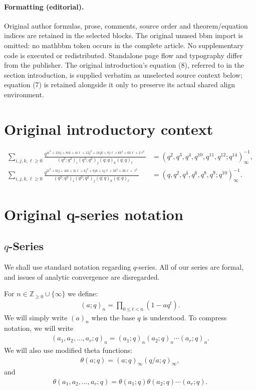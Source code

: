 \documentclass[10pt]{article}
\newcommand{\ZZ}{\mathbb{Z}}
\begin{document}
\paragraph{Formatting (editorial).} Original author formulas, prose, comments, source order and theorem/equation indices are retained in the selected blocks. The original unused bbm import is omitted: no mathbbm token occurs in the complete article. No supplementary code is executed or redistributed. Standalone page flow and typography differ from the publisher. The original introduction's equation (8), referred to in the section introduction, is supplied verbatim as unselected source context below; equation (7) is retained alongside it only to preserve its actual shared align environment.
\clearpage
\section*{Original introductory context}
\setcounter{equation}{6}
\begin{align}
\sum_{i,j,k,\ell \ge 0}
\frac{q^{4i^2 + 12 ij + 8ik + 4i\ell + 12j^2 + 16jk + 8j\ell + 6k^2+6k\ell+2\ell^2}}
{\left(q^2;q^2\right)_i\left(q^2;q^2\right)_j\left(q;q\right)_k\left(q;q\right)_\ell}
&= \left(q^2,q^3,q^4,q^{10},q^{11},q^{12};q^{14}\right)^{-1}_\infty \label{eqn:Nandi_intro}, \\ 
\sum_{i,j,k,\ell \ge 0}
\frac{q^{2i^2 + 6 ij + 4ik + 2i\ell + 6j^2 + 8 jk + 4 j\ell + 3k^2+3k\ell+\ell^2}}
{\left(q^2;q^2\right)_i\left(q^2;q^2\right)_j\left(q;q\right)_k\left(q;q\right)_\ell} 
&=\left(q,q^2,q^4,q^6,q^8,q^9;q^{10}\right)^{-1}_\infty\label{eqn:mod10_intro}.
\end{align}
\section*{Original q-series notation}
\setcounter{section}{2}
\setcounter{subsection}{1}
\setcounter{equation}{10}
\subsection{\texorpdfstring{$q$-Series}{q-Series}}
We shall use standard notation regarding $q$-series. 
All of our series are formal, and issues of analytic convergence are disregarded.

For $n\in\ZZ_{\geq 0}\cup\{\infty\}$ we define:
\begin{align}
(a;q)_n=\prod_{0\leq t<n}(1-aq^{t}).
\end{align}
We will simply write $(a)_n$ when the base $q$ is understood.
To compress notation, we will write
\begin{align}
(a_1,a_2,\dots,a_r;q)_n=(a_1;q)_n(a_2;q)_n\cdots(a_r;q)_n.
\end{align}
We will also use modified theta functions:
\begin{align}
\theta(a;q)=(a;q)_\infty(q/a;q)_\infty,
\end{align}
and
\begin{align}
\theta(a_1,a_2,\dots,a_r;q)=\theta(a_1;q)\theta(a_2;q)\cdots(a_r;q).
\end{align}
\end{document}
